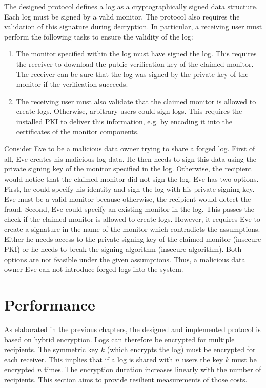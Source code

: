 \documentclass[../main.tex]{subfiles}
\begin{document}
The designed protocol defines a log as a cryptographically signed data structure.
Each log must be signed by a valid monitor.
The protocol also requires the validation of this signature during decryption.
In particular, a receiving user must perform the following tasks to ensure the validity of the log:
\begin{enumerate}
    \item 
    The monitor specified within the log must have signed the log.
    This requires the receiver to download the public verification key of the claimed monitor.
    The receiver can be sure that the log was signed by the private key of the monitor if the verification succeeds.
    \item 
    The receiving user must also validate that the claimed monitor is allowed to create logs.
    Otherwise, arbitrary users could sign logs.
    This requires the installed PKI to deliver this information, e.g. by encoding it into the certificates of the monitor components.
\end{enumerate}

Consider Eve to be a malicious data owner trying to share a forged log.
First of all, Eve creates his malicious log data.
He then needs to sign this data using the private signing key of the monitor specified in the log.
Otherwise, the recipient would notice that the claimed monitor did not sign the log.
Eve has two options.
First, he could specify his identity and sign the log with his private signing key.
Eve must be a valid monitor because otherwise, the recipient would detect the fraud.
Second, Eve could specify an existing monitor in the log.
This passes the check if the claimed monitor is allowed to create logs.
However, it requires Eve to create a signature in the name of the monitor which contradicts the assumptions.
Either he needs access to the private signing key of the claimed monitor (insecure PKI) or he needs to break the signing algorithm (insecure algorithm).
Both options are not feasible under the given assumptions.
Thus, a malicious data owner Eve can not introduce forged logs into the system.

\section{Performance}
\label{sec:evaluation-perf}
As elaborated in the previous chapters, the designed and implemented protocol is based on hybrid encryption.
Logs can therefore  be encrypted for multiple recipients.
The symmetric key $k$ (which encrypts the log) must be encrypted for each receiver.
This implies that if a log is shared with $n$ users the key $k$ must be encrypted $n$ times.
The encryption duration increases linearly with the number of recipients.
This section aims to provide resilient measurements of those costs.
\end{document}
